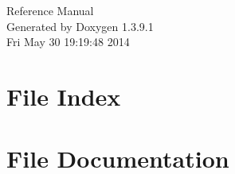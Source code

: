 \documentclass[a4paper]{book}
\begin{document}
\begin{titlepage}
\vspace*{7cm}
\begin{center}
{\Large Reference Manual}\\
\vspace*{1cm}
{\large Generated by Doxygen 1.3.9.1}\\
\vspace*{0.5cm}
{\small Fri May 30 19:19:48 2014}\\
\end{center}
\end{titlepage}
\clearemptydoublepage
{}
\tableofcontents
\clearemptydoublepage
{}
\chapter{File Index}

\chapter{File Documentation}














\printindex
\end{document}
